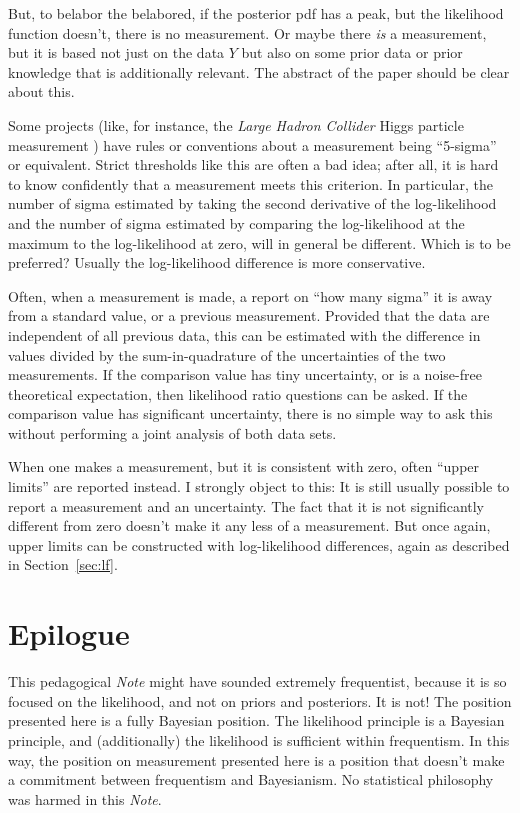 \documentclass{article}
\newcommand{\documentname}{\textsl{Note}}
\newcommand{\sectionname}{Section}
\newcommand{\secref}[1]{\sectionname~\ref{#1}}
\begin{document}
But, to belabor the belabored, if the posterior pdf has a peak, but the likelihood function doesn't, there is no measurement.
Or maybe there \emph{is} a measurement, but it is based not just on the data $Y$ but also on some prior data or prior knowledge that is additionally relevant.
The abstract of the paper should be clear about this.

Some projects (like, for instance, the \textsl{Large Hadron Collider} Higgs particle measurement \cite{lhc}) have rules or conventions about a measurement being ``5-sigma'' or equivalent.
Strict thresholds like this are often a bad idea; after all, it is hard to know confidently that a measurement meets this criterion.
In particular, the number of sigma estimated by taking the second derivative of the log-likelihood and the number of sigma estimated by comparing the log-likelihood at the maximum to the log-likelihood at zero, will in general be different.
Which is to be preferred?
Usually the log-likelihood difference is more conservative.

Often, when a measurement is made, a report on ``how many sigma'' it is away from a standard value, or a previous measurement.
Provided that the data are independent of all previous data, this can be estimated with the difference in values divided by the sum-in-quadrature of the uncertainties of the two measurements.
If the comparison value has tiny uncertainty, or is a noise-free theoretical expectation, then likelihood ratio questions can be asked.
If the comparison value has significant uncertainty, there is no simple way to ask this without performing a joint analysis of both data sets.

When one makes a measurement, but it is consistent with zero, often ``upper limits'' are reported instead.
I strongly object to this: It is still usually possible to report a measurement and an uncertainty.
The fact that it is not significantly different from zero doesn't make it any less of a measurement.
But once again, upper limits can be constructed with log-likelihood differences, again as described in \secref{sec:lf}.

\section{Epilogue}\label{sec:discussion}
This pedagogical \documentname{} might have sounded extremely frequentist, because it is so focused on the likelihood, and not on priors and posteriors.
It is not!
The position presented here is a fully Bayesian position.
The likelihood principle is a Bayesian principle, and (additionally) the likelihood is sufficient within frequentism.
In this way, the position on measurement presented here is a position that doesn't make a commitment between frequentism and Bayesianism.
No statistical philosophy was harmed in this \documentname.
\end{document}
